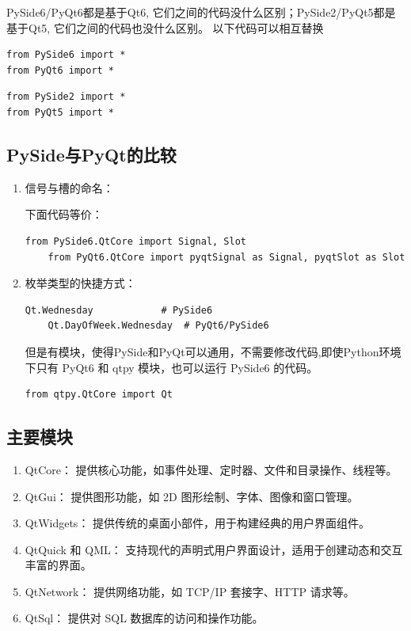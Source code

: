 PySide6/PyQt6都是基于Qt6, 它们之间的代码没什么区别；PySide2/PyQt5都是基于Qt5, 它们之间的代码也没什么区别。
以下代码可以相互替换
\begin{lstlisting}[style=demostyle,numbers=none]
from PySide6 import *
from PyQt6 import *
\end{lstlisting}
\begin{lstlisting}[style=demostyle,numbers=none]
from PySide2 import *
from PyQt5 import *
\end{lstlisting}

\subsection{PySide与PyQt的比较}
\begin{enumerate}[label=\arabic*)]
    \item 信号与槽的命名：

    下面代码等价：
    \begin{lstlisting}[style=demostyle,numbers=none]
    from PySide6.QtCore import Signal, Slot
    from PyQt6.QtCore import pyqtSignal as Signal, pyqtSlot as Slot
    \end{lstlisting}

    \item 枚举类型的快捷方式：
    \begin{lstlisting}[style=demostyle,numbers=none]
    Qt.Wednesday            # PySide6
    Qt.DayOfWeek.Wednesday  # PyQt6/PySide6
    \end{lstlisting}

    但是有模块，使得PySide和PyQt可以通用，不需要修改代码,即使Python环境下只有 PyQt6 和 qtpy 模块，也可以运行 PySide6 的代码。
    \begin{lstlisting}[style=demostyle,numbers=none]
    from qtpy.QtCore import Qt
    \end{lstlisting}
\end{enumerate}



\subsection{主要模块}
\begin{enumerate}[label=\arabic*)]
    \item QtCore：
    提供核心功能，如事件处理、定时器、文件和目录操作、线程等。
    \item QtGui：
    提供图形功能，如 2D 图形绘制、字体、图像和窗口管理。
    \item QtWidgets：
    提供传统的桌面小部件，用于构建经典的用户界面组件。
    \item QtQuick 和 QML：
    支持现代的声明式用户界面设计，适用于创建动态和交互丰富的界面。
    \item QtNetwork：
    提供网络功能，如 TCP/IP 套接字、HTTP 请求等。
    \item QtSql：
    提供对 SQL 数据库的访问和操作功能。
\end{enumerate}


